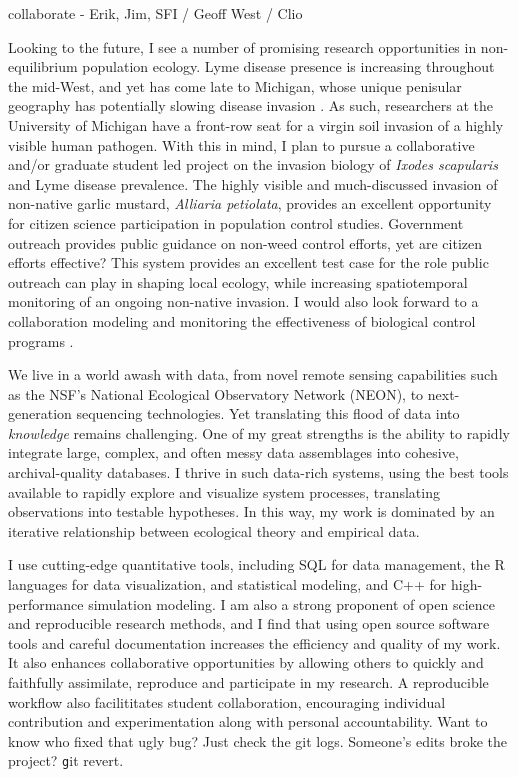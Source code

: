 \documentclass[12pt]{article}
\begin{document}
collaborate - Erik, Jim, SFI / Geoff West / Clio

Looking to the future, I see a number of promising research
opportunities in non-equilibrium population ecology. Lyme disease 
presence is increasing throughout the mid-West, and yet has come 
late to Michigan, whose unique
penisular geography has potentially slowing disease invasion \citep{hamer2010invasion}. 
As such, researchers at the University of Michigan have a front-row seat 
for a virgin soil invasion of a highly visible human pathogen.
With this in mind, I plan to pursue a collaborative and/or graduate student led
project on the invasion biology of {\em Ixodes scapularis} and Lyme disease
prevalence.  The highly visible and much-discussed invasion of non-native
garlic mustard, {\em Alliaria petiolata}, provides an excellent opportunity 
for citizen science participation in population control studies.  
Government outreach provides public guidance on non-weed control efforts, 
yet are citizen efforts effective? This system provides an excellent 
test case for the role public outreach can play in shaping local 
ecology, while increasing spatiotemporal monitoring of an ongoing non-native 
invasion. I would also look forward to a collaboration modeling and 
monitoring the effectiveness of biological control programs \citep{evans2012importance}.

We live in a world awash with data, from novel remote sensing 
capabilities such as the NSF's National Ecological Observatory 
Network (NEON), to next-generation sequencing technologies.
Yet translating this flood of data into {\em knowledge} 
remains challenging.  One of my great strengths is the
ability to rapidly integrate large, complex, and often messy 
data assemblages into cohesive, archival-quality databases.
I thrive in such data-rich systems, using the best tools
available to rapidly explore and visualize system processes,
translating observations into testable hypotheses.
In this way, my work is dominated by an iterative relationship 
between ecological theory and empirical data. 

I use cutting-edge quantitative tools, including 
SQL for data management, the R languages for data visualization,
and statistical modeling, and C++ for high-performance simulation
modeling.  I am also a strong proponent of open science and reproducible 
research methods, and I find that using open source software
tools and careful documentation increases the efficiency 
and quality of my work. It also enhances collaborative 
opportunities by allowing others to quickly and faithfully 
assimilate, reproduce and participate in my research. 
A reproducible workflow also facilititates student 
collaboration, encouraging individual contribution and 
experimentation along with personal accountability. 
Want to know who fixed that ugly bug? Just check the git logs. 
Someone's edits broke the project? {\texttt git revert}.
\end{document}

